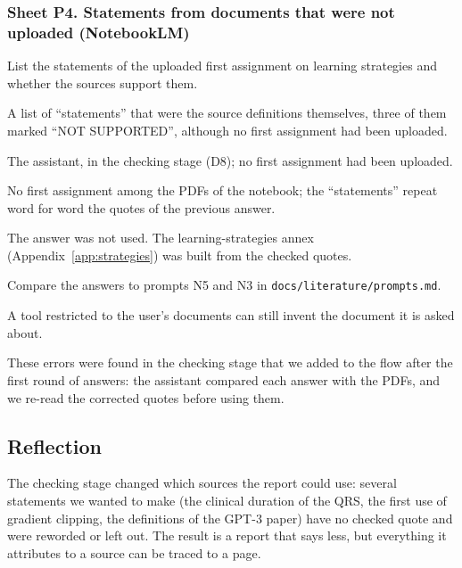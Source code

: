 \subsubsection*{Sheet P4. Statements from documents that were not uploaded (NotebookLM)}
\begin{description}[style=nextline,leftmargin=1.2em]
  \item[Prompt] List the statements of the uploaded first assignment on learning strategies and whether
        the sources support them.
  \item[Faulty response] A list of ``statements'' that were the source definitions themselves, three of
        them marked ``NOT SUPPORTED'', although no first assignment had been uploaded.
  \item[Detected by] The assistant, in the checking stage (D8); no first assignment had been uploaded.
  \item[Proof] No first assignment among the PDFs of the notebook; the ``statements'' repeat word for
        word the quotes of the previous answer.
  \item[Correction] The answer was not used. The learning-strategies annex (Appendix~\ref{app:strategies})
        was built from the checked quotes.
  \item[Reproduction] Compare the answers to prompts N5 and N3 in \texttt{docs/literature/prompts.md}.
  \item[Reflection] A tool restricted to the user's documents can still invent the document it is asked
        about.
\end{description}

These errors were found in the checking stage that we added to the flow after the first round of answers:
the assistant compared each answer with the PDFs, and we re-read the corrected quotes before using them.

\subsection*{Reflection}

The checking stage changed which sources the report could use: several statements we wanted to make
(the clinical duration of the QRS, the first use of gradient clipping, the definitions of the GPT-3
paper) have no checked quote and were reworded or left out. The result is a report that says less, but
everything it attributes to a source can be traced to a page.

